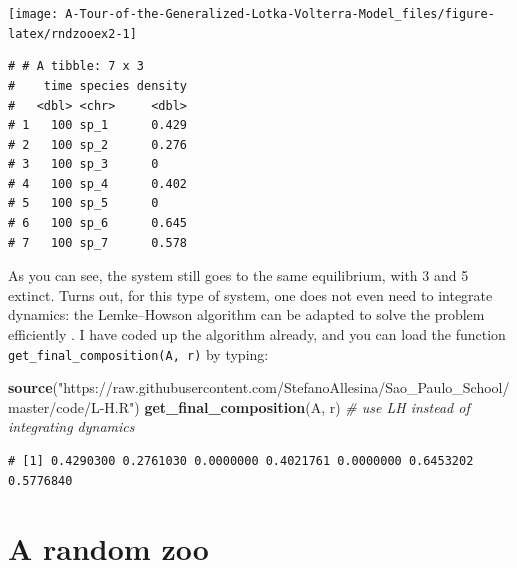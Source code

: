 \documentclass[
]{book}
\newenvironment{Shaded}{\begin{snugshade}}{\end{snugshade}}
\newcommand{\CommentTok}[1]{\textcolor[rgb]{0.56,0.35,0.01}{\textit{#1}}}
\newcommand{\DataTypeTok}[1]{\textcolor[rgb]{0.13,0.29,0.53}{#1}}
\newcommand{\DecValTok}[1]{\textcolor[rgb]{0.00,0.00,0.81}{#1}}
\newcommand{\KeywordTok}[1]{\textcolor[rgb]{0.13,0.29,0.53}{\textbf{#1}}}
\newcommand{\NormalTok}[1]{#1}
\newcommand{\OperatorTok}[1]{\textcolor[rgb]{0.81,0.36,0.00}{\textbf{#1}}}
\newcommand{\StringTok}[1]{\textcolor[rgb]{0.31,0.60,0.02}{#1}}
\begin{document}
\begin{center}\texttt{[image: A-Tour-of-the-Generalized-Lotka-Volterra-Model\_files/figure-latex/rndzooex2-1]} \end{center}

\begin{Shaded}
\end{Shaded}

\begin{verbatim}
# # A tibble: 7 x 3
#    time species density
#   <dbl> <chr>     <dbl>
# 1   100 sp_1      0.429
# 2   100 sp_2      0.276
# 3   100 sp_3      0    
# 4   100 sp_4      0.402
# 5   100 sp_5      0    
# 6   100 sp_6      0.645
# 7   100 sp_7      0.578
\end{verbatim}

As you can see, the system still goes to the same equilibrium, with 3 and 5 extinct. Turns out, for this type of system, one does not even need to integrate dynamics: the Lemke--Howson algorithm can be adapted to solve the problem efficiently \citep{servan2018coexistence}. I have coded up the algorithm already, and you can load the function \texttt{get\_final\_composition(A,\ r)} by typing:

\begin{Shaded}
\begin{Highlighting}[]
\KeywordTok{source}\NormalTok{(}\StringTok{"https://raw.githubusercontent.com/StefanoAllesina/Sao_Paulo_School/master/code/L-H.R"}\NormalTok{)}
\KeywordTok{get_final_composition}\NormalTok{(A, r) }\CommentTok{# use LH instead of integrating dynamics}
\end{Highlighting}
\end{Shaded}

\begin{verbatim}
# [1] 0.4290300 0.2761030 0.0000000 0.4021761 0.0000000 0.6453202 0.5776840
\end{verbatim}

\hypertarget{a-random-zoo}{%
\section{A random zoo}\label{a-random-zoo}}
\end{document}
